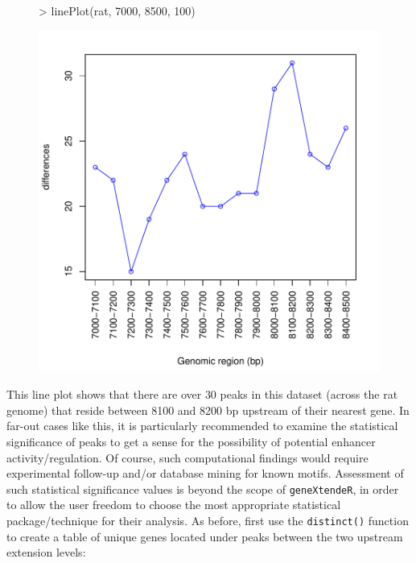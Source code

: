\documentclass[12pt]{article}
\begin{document}
\begin{figure}[H]
\begin{center}
\begin{Schunk}
\begin{Sinput}
> linePlot(rat, 7000, 8500, 100)
\end{Sinput}
\end{Schunk}
\includegraphics{geneXtendeR-039}
\end{center}
\end{figure}

This line plot shows that there are over 30 peaks in this dataset (across the rat genome) that reside between 8100 and 8200 bp upstream of their nearest gene.  In far-out cases like this, it is particularly recommended to examine the statistical significance of peaks to get a sense for the possibility of potential enhancer activity/regulation.  Of course, such computational findings would require experimental follow-up and/or database mining for known motifs.  Assessment of such statistical significance values is beyond the scope of \texttt{geneXtendeR}, in order to allow the user freedom to choose the most appropriate statistical package/technique for their analysis.  As before, first use the \texttt{distinct()} function to create a table of unique genes located under peaks between the two upstream extension levels:
\end{document}
